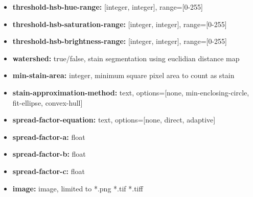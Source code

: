 \documentclass[10pt,letterpaper,titlepage]{article}
\begin{document}
\begin{itemize}
\begin{itemize}
\begin{itemize}
                \item \textbf{threshold-hsb-hue-range:} [integer, integer], range=[0-255]
                \item \textbf{threshold-hsb-saturation-range:} [integer, integer], range=[0-255]
                \item \textbf{threshold-hsb-brightness-range:} [integer, integer], range=[0-255]
                \item \textbf{watershed:} true/false, stain segmentation using euclidian distance map
                \item \textbf{min-stain-area:} integer, minimum square pixel area to count as stain
                \item \textbf{stain-approximation-method:} text, options=[none, min-enclosing-circle, fit-ellipse, convex-hull]
                \item \textbf{spread-factor-equation:} text, options=[none, direct, adaptive]
                \item \textbf{spread-factor-a:} float
                \item \textbf{spread-factor-b:} float
                \item \textbf{spread-factor-c:} float
                \item \textbf{image:} image, limited to *.png *.tif *.tiff
            \end{itemize}
        \end{itemize}
    \end{itemize}

    \newpage
\end{document}

